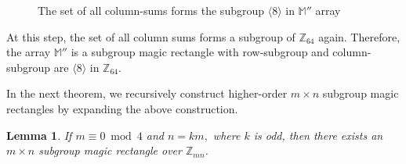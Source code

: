 \documentclass[preprint,11pt]{elsarticle}
\newtheorem{lemma}[theorem]{Lemma}
\begin{document}
\begin{figure}[h]
\caption{The set of all column-sums forms the subgroup $\langle 8 \rangle$ in $\mathbb{M}''$ array}
\end{figure}

\noindent At this step, the set of all column sums forms a subgroup of $\mathbb{Z}_{64}$ again. Therefore, the array $\mathbb{M}''$ is a subgroup magic rectangle with row-subgroup and column-subgroup are $\langle 8 \rangle$ in $\mathbb{Z}_{64}$. 
\par In the next theorem, we recursively construct higher-order $m \times n$ subgroup magic rectangles by expanding the above construction.
\begin{lemma}\label{karlem}
   If $m\equiv 0\bmod{4}$ and $n=km,$ where $k$ is odd, then there exists an $m\times n$ subgroup magic rectangle over $\mathbb{Z}_{mn}$.
\end{lemma}
\end{document}
